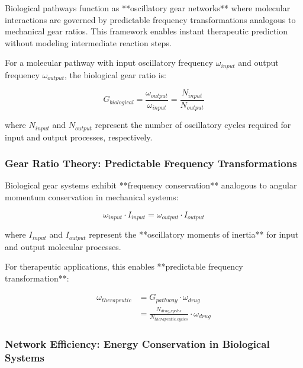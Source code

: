 Biological pathways function as **oscillatory gear networks** where molecular interactions are governed by predictable frequency transformations analogous to mechanical gear ratios. This framework enables instant therapeutic prediction without modeling intermediate reaction steps.

\begin{definition}
For a molecular pathway with input oscillatory frequency $\omega_{input}$ and output frequency $\omega_{output}$, the biological gear ratio is:

\begin{equation}
G_{biological} = \frac{\omega_{output}}{\omega_{input}} = \frac{N_{input}}{N_{output}}
\end{equation}

where $N_{input}$ and $N_{output}$ represent the number of oscillatory cycles required for input and output processes, respectively.
\end{definition}

\subsubsection{Gear Ratio Theory: Predictable Frequency Transformations}

Biological gear systems exhibit **frequency conservation** analogous to angular momentum conservation in mechanical systems:

\begin{equation}
\omega_{input} \cdot I_{input} = \omega_{output} \cdot I_{output}
\end{equation}

where $I_{input}$ and $I_{output}$ represent the **oscillatory moments of inertia** for input and output molecular processes.

For therapeutic applications, this enables **predictable frequency transformation**:

\begin{align}
\omega_{therapeutic} &= G_{pathway} \cdot \omega_{drug} \\
&= \frac{N_{drug\_cycles}}{N_{therapeutic\_cycles}} \cdot \omega_{drug}
\end{align}

\subsubsection{Network Efficiency: Energy Conservation in Biological Systems}

